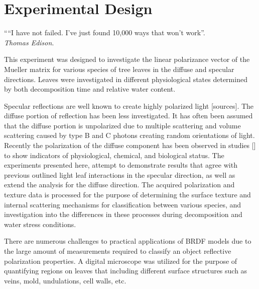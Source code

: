 \chapter{Experimental Design}
\begin{center}
  \begin{minipage}{0.75\textwidth}
    \begin{small}
      ““I have not failed. I've just found 10,000 ways that won't work”.\\
      \null\hfill\emph{Thomas Edison}.
    \end{small}
  \end{minipage}
  \vspace{0.5cm}
\end{center}

This experiment was designed to investigate the linear polarizance vector of the Mueller matrix for various species of tree leaves in the diffuse and specular directions.  Leaves were investigated in different physiological states determined by both decomposition time and relative water content.

Specular reflections are well known to create highly polarized light [sources]. The diffuse portion of reflection has been less investigated.  It has often been assumed that the diffuse portion is unpolarized due to multiple scattering and volume scattering caused by type B and C photons creating random orientations of light.  Recently the polarization of the diffuse component has been observed in studies [] to show indicators of physiological, chemical, and biological status.  The experiments presented here, attempt to demonstrate results that agree with previous outlined light leaf interactions in the specular direction, as well as extend the analysis for the diffuse direction.  The acquired polarization and texture data is processed for the purpose of determining the surface texture and internal scattering mechanisms for classification between various species, and investigation into the differences in these processes during decomposition and water stress conditions.

There are numerous challenges to practical applications of BRDF models due to the large amount of measurements required to classify an object reflective polarization properties.  A digital microscope was utilized for the purpose of quantifying regions on leaves that including different surface structures such as veins, mold, undulations, cell walls, etc.

